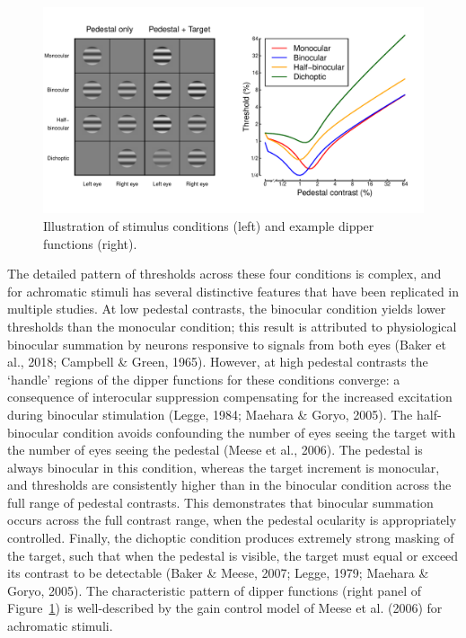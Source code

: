 \documentclass[
  letterpaper,
  DIV=11,
  numbers=noendperiod]{scrartcl}
\begin{document}
\begin{figure}

{\centering \includegraphics{Figures/exampledips.pdf}

}

\caption{\label{fig-exampledips}Illustration of stimulus conditions
(left) and example dipper functions (right).}

\end{figure}

The detailed pattern of thresholds across these four conditions is
complex, and for achromatic stimuli has several distinctive features
that have been replicated in multiple studies. At low pedestal
contrasts, the binocular condition yields lower thresholds than the
monocular condition; this result is attributed to physiological
binocular summation by neurons responsive to signals from both eyes
(Baker et al., 2018; Campbell \& Green, 1965). However, at high pedestal
contrasts the `handle' regions of the dipper functions for these
conditions converge: a consequence of interocular suppression
compensating for the increased excitation during binocular stimulation
(Legge, 1984; Maehara \& Goryo, 2005). The half-binocular condition
avoids confounding the number of eyes seeing the target with the number
of eyes seeing the pedestal (Meese et al., 2006). The pedestal is always
binocular in this condition, whereas the target increment is monocular,
and thresholds are consistently higher than in the binocular condition
across the full range of pedestal contrasts. This demonstrates that
binocular summation occurs across the full contrast range, when the
pedestal ocularity is appropriately controlled. Finally, the dichoptic
condition produces extremely strong masking of the target, such that
when the pedestal is visible, the target must equal or exceed its
contrast to be detectable (Baker \& Meese, 2007; Legge, 1979; Maehara \&
Goryo, 2005). The characteristic pattern of dipper functions (right
panel of Figure~\ref{fig-exampledips}) is well-described by the gain
control model of Meese et al. (2006) for achromatic stimuli.
\end{document}
